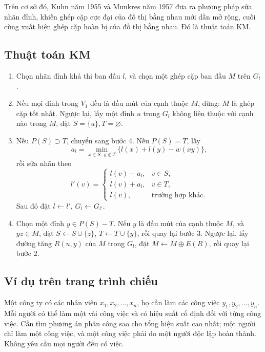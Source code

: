 \documentclass[11pt]{article}
\begin{document}
Trên cơ sở đó, Kuhn năm 1955 và Munkres năm 1957 đưa ra phương pháp sửa nhãn
đỉnh, khiến ghép cặp cực đại của đồ thị bằng nhau mới dần mở rộng, cuối cùng
xuất hiện ghép cặp hoàn bị của đồ thị bằng nhau. Đó là thuật toán KM.

\subsection*{Thuật toán KM}

\begin{enumerate}
  \item Chọn nhãn đỉnh khả thi ban đầu \(l\), và chọn một ghép cặp ban đầu
  \(M\) trên \(G_l\).
  \item Nếu mọi đỉnh trong \(V_1\) đều là đầu mút của cạnh thuộc \(M\), dừng:
  \(M\) là ghép cặp tốt nhất. Ngược lại, lấy một đỉnh \(u\) trong \(G_l\)
  không liên thuộc với cạnh nào trong \(M\), đặt \(S=\{u\},T=\varnothing\).
  \item Nếu \(P(S)\supset T\), chuyển sang bước 4. Nếu \(P(S)=T\), lấy
  \[
  a_l=\min_{x\in S,\ y\notin T}\{l(x)+l(y)-w(xy)\},
  \]
  rồi sửa nhãn theo
  \[
  l'(v)=
  \begin{cases}
  l(v)-a_l, & v\in S,\\
  l(v)+a_l, & v\in T,\\
  l(v), & \text{trường hợp khác}.
  \end{cases}
  \]
  Sau đó đặt \(l\leftarrow l'\), \(G_l\leftarrow G_{l'}\).
  \item Chọn một đỉnh \(y\in P(S)-T\). Nếu \(y\) là đầu mút của cạnh thuộc
  \(M\), và \(yz\in M\), đặt \(S\leftarrow S\cup\{z\}\),
  \(T\leftarrow T\cup\{y\}\), rồi quay lại bước 3. Ngược lại, lấy đường tăng
  \(R(u,y)\) của \(M\) trong \(G_l\), đặt \(M\leftarrow M\oplus E(R)\), rồi
  quay lại bước 2.
\end{enumerate}

\subsection*{Ví dụ trên trang trình chiếu}

Một công ty có các nhân viên \(x_1,x_2,\ldots,x_n\), họ cần làm các công
việc \(y_1,y_2,\ldots,y_n\). Mỗi người có thể làm một vài công việc và có
hiệu suất cố định đối với từng công việc. Cần tìm phương án phân công sao
cho tổng hiệu suất cao nhất; một người chỉ làm một công việc, và một công
việc phải do một người độc lập hoàn thành. Không yêu cầu mọi người đều có
việc.
\end{document}
